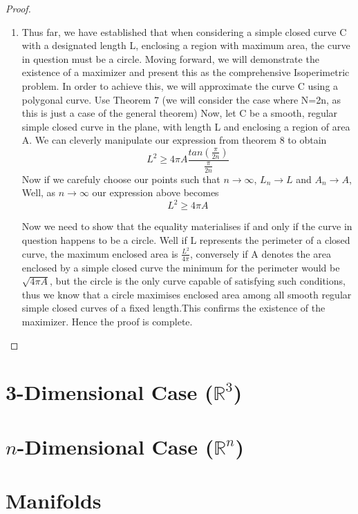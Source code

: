 \documentclass[a4paper]{book}
\begin{document}
\begin{proof}
\begin{enumerate}
        \item Thus far, we have established that when considering a simple closed curve C with a designated length L, enclosing a region with maximum area, the curve in question must be a circle. Moving forward, we will demonstrate the existence of a maximizer and present this as the comprehensive Isoperimetric problem. In order to achieve this, we will approximate the curve C using a polygonal curve. 
        Use Theorem 7 (we will consider the case where N=2n, as this is just a case of the general theorem)
        Now, let C be a smooth, regular simple closed curve in the plane, with length L and enclosing a region of area A. 
        We can cleverly manipulate our expression from theorem 8 to obtain
        $$L^{2} \ge 4\pi A \frac{tan(\frac{\pi}{2n})}{\frac{\pi}{2n}}$$
        Now if we carefuly choose our points such that $n \to \infty $,  $L_{n} \to L$ and $A_{n} \to A$, 
        Well, as $n \to \infty$ our expression above becomes
        $$L^{2} \ge 4\pi A$$

        Now we need to show that the equality materialises if and only if the curve in question happens to be a circle. Well if L represents the perimeter of a closed curve, the maximum enclosed area is $\frac{L^{2}}{4\pi}$, conversely if A denotes the area enclosed by a simple closed curve the minimum for the perimeter would be $\sqrt{4 \pi A}$, but the circle is the only curve capable of satisfying such conditions, thus we know that a circle maximises enclosed area among all smooth regular simple closed curves of a fixed length.This confirms the existence of the maximizer. Hence the proof is complete.  
    \end{enumerate}
\end{proof}

\chapter{3-Dimensional Case ($\mathbb{R}^3$)}

\chapter{$n$-Dimensional Case ($\mathbb{R}^n$)}

\chapter{Manifolds}



\end{document}
